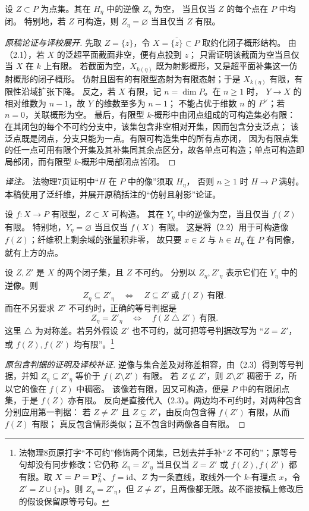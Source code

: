 设 \(Z\subset P\) 为点集。其在 \(H_\eta\) 中的逆像 \(Z_\eta\) 为空，
当且仅当 \(Z\) 的每个点在 \(P\) 中均闭。
特别地，若 \(Z\) 可构造，则 \(Z_\eta=\varnothing\) 当且仅当 \(Z\) 有限。
\begin{proof}[原稿论证与译校展开]
先取 \(Z=\{z\}\)，令 \(X=\overline{\{z\}}\subset P\) 取约化闭子概形结构。
由（2.1），若 \(X\) 的泛超平面截面非空，便有点投到 \(z\)；
只需证明该截面为空当且仅当 \(X\) 在 \(k\) 上有限。
若截面为空，\(X_{k(\eta)}\) 既为射影概形，又是超平面补集这一仿射概形的闭子概形。
仿射且固有的有限型态射为有限态射；于是 \(X_{k(\eta)}\) 有限，有限性沿域扩张下降。
反之，若 \(X\) 有限，记 \(n=\dim P\)。在 \(n\ge1\) 时，
\(Y\to X\) 的相对维数为 \(n-1\)，故 \(Y\) 的维数至多为 \(n-1\)；
不能占优于维数 \(n\) 的 \(P^\vee\)；若 \(n=0\)，关联概形为空。
最后，有限型 \(k\)-概形中由闭点组成的可构造集必有限：
在其闭包的每个不可约分支中，该集包含非空相对开集，因而包含分支泛点；
该泛点既是闭点，分支只能为一点。有限可构造集中的所有点亦闭，
因为有限点集的任一点可用有限个开集及其补集同其余点区分，故各单点可构造；单点可构造即局部闭，而有限型 \(k\)-概形中局部闭点皆闭。
\end{proof}
\noindent\emph{译注。} 法物理7页证明中“\(H\) 在 \(P\) 中的像”须取 \(H_\eta\)，
否则 \(n\ge1\) 时 \(H\to P\) 满射。本稿使用了泛纤维，并展开原稿括注的“仿射且射影”论证。

设 \(f:X\to P\) 有限型，\(Z\subset X\) 可构造。
其在 \(Y_\eta\) 中的逆像为空，当且仅当 \(f(Z)\) 有限。
特别地，\(Y_\eta=\varnothing\) 当且仅当 \(f(X)\) 有限。
这是将（2.2）用于可构造像 \(f(Z)\)；纤维积上剩余域的张量积非零，
故只要 \(x\in Z\) 与 \(h\in H_\eta\) 在 \(P\) 有同像，就有上方的点。

设 \(Z,Z'\) 是 \(X\) 的两个闭子集，且 \(Z\) 不可约。
分别以 \(Z_\eta,Z'_\eta\) 表示它们在 \(Y_\eta\) 中的逆像。则
\[
 Z_\eta\subseteq Z'_\eta
 \quad\Longleftrightarrow\quad
 Z\subseteq Z'\ \text{或}\ f(Z)\ \text{有限}.
\]
而在不另要求 \(Z'\) 不可约时，正确的等号判据是
\[
 Z_\eta=Z'_\eta\quad\Longleftrightarrow\quad
 f(Z\mathbin{\triangle} Z')\ \text{有限}.
\]
这里 \(\triangle\) 为对称差。若另外假设 \(Z'\) 也不可约，就可把等号判据改写为
“\(Z=Z'\)，或 \(f(Z),f(Z')\) 均有限”。\footnote{法物理8页原打字“不可约”修饰两个闭集，已划去并手补“\(Z\) 不可约”；原等号句却没有同步修改：它仍称 $Z_\eta=Z'_\eta$ 当且仅当 $Z=Z'$ 或 $f(Z),f(Z')$ 都有限。取 \(X=P=\mathbf P^2_k\)、\(f=\mathrm{id}\)、\(Z\) 为一条直线，取线外一个 \(k\)-有理点 \(x\)，令 \(Z'=Z\cup\{x\}\)。则 \(Z_\eta=Z'_\eta\)，但 \(Z\ne Z'\)，且两像都无限。故不能按稿上修改后的假设保留原等号句。}
\begin{proof}[原包含判据的证明及译校补证]
逆像与集合差及对称差相容，由（2.3）得到等号判据，并知
\(Z_\eta\subseteq Z'_\eta\) 等价于 \(f(Z\setminus Z')\) 有限。
若 \(Z\nsubseteq Z'\)，则 \(Z\setminus Z'\) 稠密于 \(Z\)，所以它的像在 \(f(Z)\) 中稠密。
该像若有限，因又可构造，便是 \(P\) 中的有限闭点集，于是 \(f(Z)\) 亦有限。
反向是直接代入（2.3）。两边均不可约时，对两种包含分别应用第一判据：
若 \(Z\ne Z'\) 且 \(Z\subsetneq Z'\)，由反向包含得 \(f(Z')\) 有限，从而 \(f(Z)\) 有限；
真反包含情形类似；互不包含时两像各自有限。
\end{proof}

